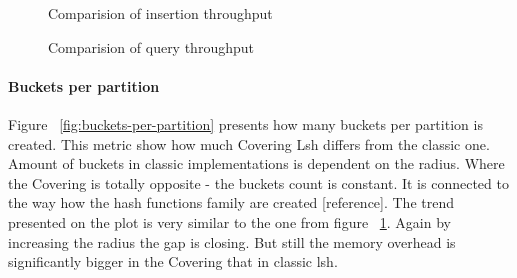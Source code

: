 \begin{figure}[ht]

  \caption{Comparision of insertion throughput}
  \label{fig:insertions-per-second}
\end{figure}

\begin{figure}[ht]

  \caption{Comparision of query throughput}
  \label{fig:queries-per-second}
\end{figure}

\paragraph{Buckets per partition}

Figure ~\ref{fig:buckets-per-partition} presents how many buckets per partition is created. This metric show how much Covering Lsh differs from the classic one. Amount of buckets in classic implementations is dependent on the radius. Where the Covering is totally opposite - the buckets count is constant. It is connected to the way how the hash functions family are created [reference]. The trend presented on the plot is very similar to the one from figure ~\ref{fig:insertions-per-second}. Again by increasing the radius the gap is closing. But still the memory overhead is significantly bigger in the Covering that in classic lsh.

